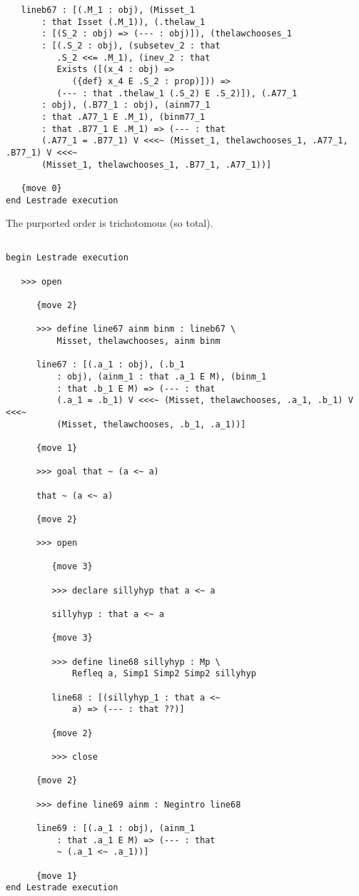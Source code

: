 \documentclass[12pt]{article}
\begin{document}
\begin{verbatim}
   lineb67 : [(.M_1 : obj), (Misset_1 
       : that Isset (.M_1)), (.thelaw_1 
       : [(S_2 : obj) => (--- : obj)]), (thelawchooses_1 
       : [(.S_2 : obj), (subsetev_2 : that 
          .S_2 <<= .M_1), (inev_2 : that 
          Exists ([(x_4 : obj) => 
             ({def} x_4 E .S_2 : prop)])) => 
          (--- : that .thelaw_1 (.S_2) E .S_2)]), (.A77_1 
       : obj), (.B77_1 : obj), (ainm77_1 
       : that .A77_1 E .M_1), (binm77_1 
       : that .B77_1 E .M_1) => (--- : that 
       (.A77_1 = .B77_1) V <<<~ (Misset_1, thelawchooses_1, .A77_1, .B77_1) V <<<~ 
       (Misset_1, thelawchooses_1, .B77_1, .A77_1))]

   {move 0}
end Lestrade execution
\end{verbatim}

The purported order is trichotomous (so total).

\begin{verbatim}

begin Lestrade execution

   >>> open

      {move 2}

      >>> define line67 ainm binm : lineb67 \
          Misset, thelawchooses, ainm binm

      line67 : [(.a_1 : obj), (.b_1 
          : obj), (ainm_1 : that .a_1 E M), (binm_1 
          : that .b_1 E M) => (--- : that 
          (.a_1 = .b_1) V <<<~ (Misset, thelawchooses, .a_1, .b_1) V <<<~ 
          (Misset, thelawchooses, .b_1, .a_1))]

      {move 1}

      >>> goal that ~ (a <~ a)

      that ~ (a <~ a)

      {move 2}

      >>> open

         {move 3}

         >>> declare sillyhyp that a <~ a

         sillyhyp : that a <~ a

         {move 3}

         >>> define line68 sillyhyp : Mp \
             Refleq a, Simp1 Simp2 Simp2 sillyhyp

         line68 : [(sillyhyp_1 : that a <~ 
             a) => (--- : that ??)]

         {move 2}

         >>> close

      {move 2}

      >>> define line69 ainm : Negintro line68

      line69 : [(.a_1 : obj), (ainm_1 
          : that .a_1 E M) => (--- : that 
          ~ (.a_1 <~ .a_1))]

      {move 1}
end Lestrade execution
\end{verbatim}
\end{document}
